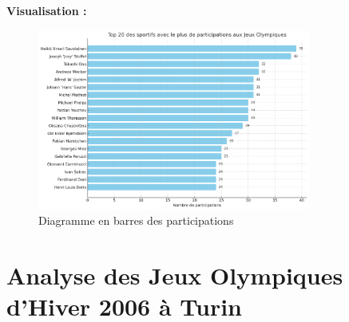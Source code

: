 \documentclass[fontsize=10pt,oneside]{scrreprt}
\begin{document}
\textbf{Visualisation :}
\begin{figure}[H]
    \centering
    \includegraphics[width=0.8\textwidth]{charts/top20sportifsayantleplusdeparticipationsauxJO.png}
    \caption{Diagramme en barres des participations}
    \label{fig:top20_participations}
\end{figure}

\chapter{Analyse des Jeux Olympiques d'Hiver 2006 à Turin}
\end{document}

